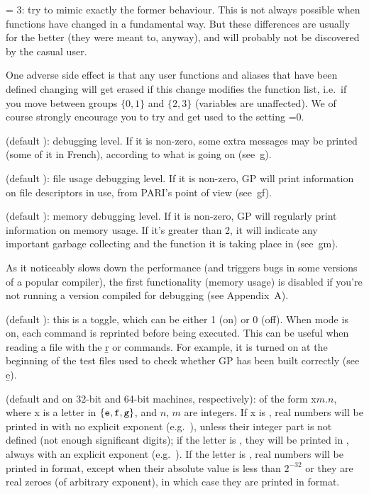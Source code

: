 \quad {} = 3: try to mimic exactly the former behaviour. This
is not always possible when functions have changed in a fundamental way.
But these differences are usually for the better (they were meant to,
anyway), and will probably not be discovered by the casual user.

One adverse side effect is that any user functions and aliases that have
been defined  changing  will get erased if this
change modifies the function list, i.e.~if you move between groups
$\{0,1\}$ and $\{2,3\}$ (variables are unaffected). We of course strongly
encourage you to try and get used to the setting =0.

 (default ): debugging level. If it is non-zero,
some extra messages may be printed (some of it in French), according to
what is going on (see~\b{g}).

 (default ): file usage debugging level. If it
is non-zero, GP will print information on file descriptors in use, from
PARI's point of view (see~\b{gf}).

 (default ): memory debugging level. If it is
non-zero, GP will regularly print information on memory usage. If it's
greater than 2, it will indicate any important garbage collecting and the
function it is taking place in (see~\b{gm}).

 As it noticeably slows down the performance
(and triggers bugs in some versions of a popular compiler), the first
functionality (memory usage) is disabled if you're not running a version
compiled for debugging (see Appendix~A).

 (default ): this is a toggle, which can be either 1
(on) or 0 (off). When  mode is on, each command is reprinted before
being executed. This can be useful when reading a file with the \b{r} or
 commands. For example, it is turned on at the beginning of the test
files used to check whether GP has been built correctly (see \b{e}).

 (default  and  on 32-bit and
64-bit machines, respectively): of the form x$m.n$, where x is a letter in
$\{{\tt e},{\tt f},{\tt g}\}$, and $n$, $m$ are integers. If x is ,
real numbers will be printed in  with no
explicit exponent (e.g.~), unless their integer part is not
defined (not enough significant digits); if the letter is , they
will be printed in , always with an explicit
exponent (e.g.~). If the letter is , real numbers will
be printed in  format, except when their absolute value is less than
$2^{-32}$ or they are real zeroes (of arbitrary exponent), in which case
they are printed in  format.\label{se:format}

